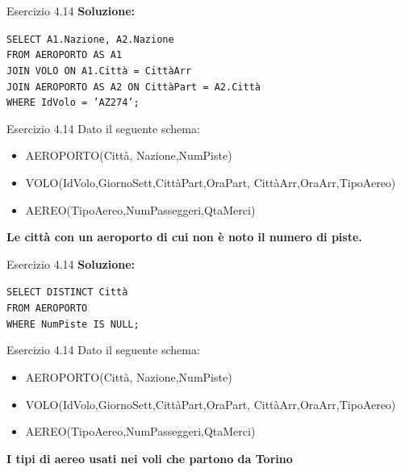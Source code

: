 \begin{frame}{Esercizio 4.14}
    \textbf{Soluzione:}
    \vspace{1em}
    
    \texttt{SELECT A1.Nazione, A2.Nazione\\FROM AEROPORTO AS A1\\ JOIN VOLO ON A1.Citt\`a = Citt\`aArr \\JOIN AEROPORTO AS A2 ON Citt\`aPart = A2.Citt\`a\\WHERE IdVolo = 'AZ274';
}
    \end{frame}
\begin{frame}{Esercizio 4.14}
    Dato il seguente schema:
    \begin{itemize}
        \item AEROPORTO(Citt\`a, Nazione,NumPiste)
        \item VOLO(IdVolo,GiornoSett,Citt\`aPart,OraPart,
        Citt\`aArr,OraArr,TipoAereo)
        \item AEREO(TipoAereo,NumPasseggeri,QtaMerci)
    \end{itemize}
    \vspace{1em}
    
    \textbf{Le citt\`a con un aeroporto di cui non \`e noto il numero di piste.}
\end{frame}

\begin{frame}{Esercizio 4.14}
    \textbf{Soluzione:}
    \vspace{1em}
    
    \texttt{SELECT DISTINCT Citt\`a\\FROM AEROPORTO\\WHERE NumPiste IS NULL;}
    \end{frame}
\begin{frame}{Esercizio 4.14}
    Dato il seguente schema:
    \begin{itemize}
        \item AEROPORTO(Citt\`a, Nazione,NumPiste)
        \item VOLO(IdVolo,GiornoSett,Citt\`aPart,OraPart,
        Citt\`aArr,OraArr,TipoAereo)
        \item AEREO(TipoAereo,NumPasseggeri,QtaMerci)
    \end{itemize}
    \vspace{1em}
    
    \textbf{I tipi di aereo usati nei voli che partono da Torino}
\end{frame}

